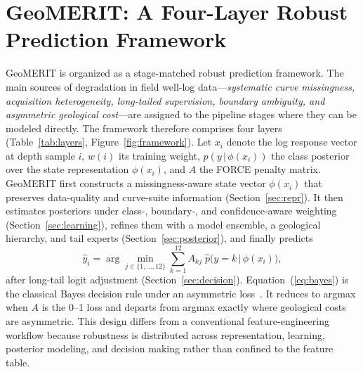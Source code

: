 \documentclass[bdcc,article,submit,pdftex,moreauthors]{Definitions/mdpi}
\begin{document}
\section{GeoMERIT: A Four-Layer Robust Prediction Framework}
\label{sec:method}
GeoMERIT is organized as a stage-matched robust prediction framework. The main sources of
degradation in field well-log data---\emph{systematic curve missingness, acquisition
heterogeneity, long-tailed supervision, boundary ambiguity, and asymmetric geological
cost}---are assigned to the pipeline stages where they can be modeled directly. The framework
therefore comprises four layers (Table~\ref{tab:layers}, Figure~\ref{fig:framework}). Let $x_i$
denote the log response vector at depth sample $i$, $w(i)$ its training weight,
$p(y\,|\,\phi(x_i))$ the class posterior over the state representation $\phi(x_i)$, and $A$
the FORCE penalty matrix. GeoMERIT first constructs a missingness-aware state vector
$\phi(x_i)$ that preserves data-quality and curve-suite information
(Section~\ref{sec:repr}). It then estimates posteriors under class-, boundary-, and
confidence-aware weighting (Section~\ref{sec:learning}), refines them with a model ensemble, a
geological hierarchy, and tail experts (Section~\ref{sec:posterior}), and finally predicts
\begin{equation}
\hat y_i = \arg\min_{j\in\{1,\ldots,12\}} \sum_{k=1}^{12} A_{kj}\;\hat p\!\bigl(y=k\,\big|\,\phi(x_i)\bigr),
\label{eq:bayes}
\end{equation}
after long-tail logit adjustment (Section~\ref{sec:decision}). Equation~(\ref{eq:bayes}) is
the classical Bayes decision rule under an asymmetric loss~\cite{berger1985decision}. It
reduces to argmax when $A$ is the 0--1 loss and departs from argmax exactly where
geological costs are asymmetric. This design differs from a conventional feature-engineering
workflow because robustness is distributed across representation, learning, posterior modeling,
and decision making rather than confined to the feature table.
\end{document}
